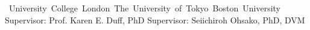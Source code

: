 %
%
%


\begin{cventries}

    {\vspace*{-0.45cm}\mbox{\hspace{-0.35mm} University College London
        \hspace{16.45mm} The University of Tokyo
        \hspace{21.25mm} Boston University}}
    {}
    {}
    {\hspace{0mm} {\small{Supervisor: Prof. Karen E. Duff, PhD}}
        \hspace{15.75mm} {\small{Supervisor: Seiichiroh Ohsako, PhD, DVM}}}

\end{cventries}

\vspace*{-0.1cm}
